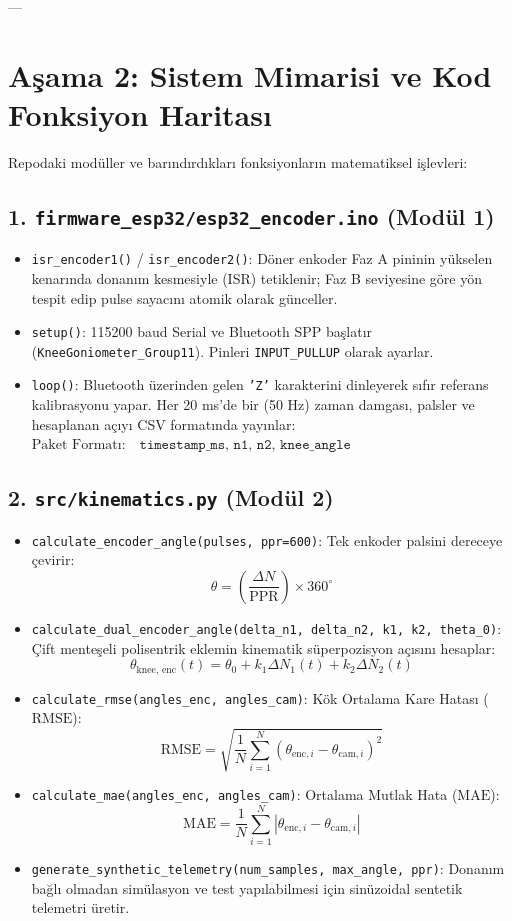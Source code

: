 \documentclass[11pt, a4paper]{article}
\begin{document}
---

\section{Aşama 2: Sistem Mimarisi ve Kod Fonksiyon Haritası}

Repodaki modüller ve barındırdıkları fonksiyonların matematiksel işlevleri:

\subsection{1. \texttt{firmware\_esp32/esp32\_encoder.ino} (Modül 1)}
\begin{itemize}[leftmargin=1.5em]
    \item \texttt{isr\_encoder1()} / \texttt{isr\_encoder2()}: Döner enkoder Faz A pininin yükselen kenarında donanım kesmesiyle (ISR) tetiklenir; Faz B seviyesine göre yön tespit edip pulse sayacını atomik olarak günceller.
    \item \texttt{setup()}: 115200 baud Serial ve Bluetooth SPP başlatır (\texttt{KneeGoniometer\_Group11}). Pinleri \texttt{INPUT\_PULLUP} olarak ayarlar.
    \item \texttt{loop()}: Bluetooth üzerinden gelen \texttt{'Z'} karakterini dinleyerek sıfır referans kalibrasyonu yapar. Her 20 ms'de bir (50 Hz) zaman damgası, palsler ve hesaplanan açıyı CSV formatında yayınlar:\\
    $\text{Paket Formatı:} \quad \texttt{timestamp\_ms, n1, n2, knee\_angle}$
\end{itemize}

\subsection{2. \texttt{src/kinematics.py} (Modül 2)}
\begin{itemize}[leftmargin=1.5em]
    \item \texttt{calculate\_encoder\_angle(pulses, ppr=600)}: Tek enkoder palsini dereceye çevirir:
    $$\theta = \left(\frac{\Delta N}{\text{PPR}}\right) \times 360^\circ$$
    \item \texttt{calculate\_dual\_encoder\_angle(delta\_n1, delta\_n2, k1, k2, theta\_0)}: Çift menteşeli polisentrik eklemin kinematik süperpozisyon açısını hesaplar:
    $$\theta_{\text{knee, enc}}(t) = \theta_0 + k_1 \Delta N_1(t) + k_2 \Delta N_2(t)$$
    \item \texttt{calculate\_rmse(angles\_enc, angles\_cam)}: Kök Ortalama Kare Hatası ($\text{RMSE}$):
    $$\text{RMSE} = \sqrt{\frac{1}{N} \sum_{i=1}^{N} \left(\theta_{\text{enc}, i} - \theta_{\text{cam}, i}\right)^2}$$
    \item \texttt{calculate\_mae(angles\_enc, angles\_cam)}: Ortalama Mutlak Hata ($\text{MAE}$):
    $$\text{MAE} = \frac{1}{N} \sum_{i=1}^{N} |\theta_{\text{enc}, i} - \theta_{\text{cam}, i}|$$
    \item \texttt{generate\_synthetic\_telemetry(num\_samples, max\_angle, ppr)}: Donanım bağlı olmadan simülasyon ve test yapılabilmesi için sinüzoidal sentetik telemetri üretir.
\end{itemize}
\end{document}
